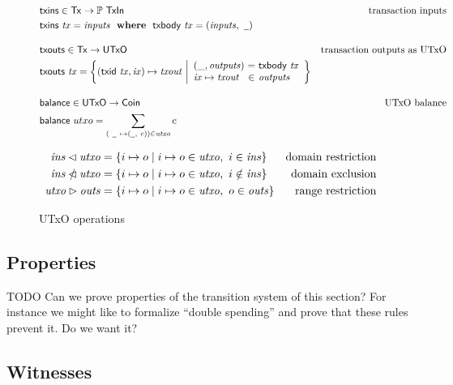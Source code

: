 \documentclass[11pt,a4paper]{article}
\newenvironment{todo}
  {\begin{bclogo}[logo=\bcoutil, couleur=red!5, couleurBarre=red, arrondi=0.2]{ TODO}}
    {\end{bclogo}}
\newcommand{\powerset}[1]{\mathbb{P}~#1}
\newcommand{\restrictdom}{\lhd}
\newcommand{\subtractdom}{\mathbin{\slashed{\restrictdom}}}
\newcommand{\restrictrange}{\rhd}
\newcommand{\var}[1]{\mathit{#1}}
\newcommand{\fun}[1]{\mathsf{#1}}
\newcommand{\type}[1]{\mathsf{#1}}
\newcommand{\nextdef}{\\[1em]}
\newcommand{\where}{~ ~ \mathbf{where}~ ~ }
\newcommand{\Tx}{\type{Tx}}
\newcommand{\UTxO}{\type{UTxO}}
\newcommand{\Coin}{\type{Coin}}
\newcommand{\TxIn}{\type{TxIn}}
\newcommand{\txins}[1]{\fun{txins}~ \var{#1}}
\newcommand{\txbody}[1]{\fun{txbody}~ \var{#1}}
\newcommand{\wcard}[0]{\underline{\phantom{a}}}
\begin{document}
\begin{figure}
  \begin{align*}
    & \fun{txins} \in \Tx \to \powerset{\TxIn}
    & \text{transaction inputs} \\
    & \txins{tx} = \var{inputs} \where \txbody{tx} = (\var{inputs}, ~\wcard)
    \nextdef
    & \fun{txouts} \in \Tx \to \UTxO
    & \text{transaction outputs as UTxO} \\
    & \fun{txouts} ~ \var{tx} =
      \left\{ (\fun{txid} ~ \var{tx}, \var{ix}) \mapsto \var{txout} ~
      \middle| \begin{array}{l@{~}c@{~}l}
                 (\_, \var{outputs}) & = & \txbody{tx} \\
                 \var{ix} \mapsto \var{txout} & \in & \var{outputs}
               \end{array}
      \right\}
    \nextdef
    & \fun{balance} \in \UTxO \to \Coin
    & \text{UTxO balance} \\
    & \fun{balance} ~ utxo = \sum_{(~\wcard ~ \mapsto (\wcard, ~c)) \in \var{utxo}} c
  \end{align*}

  \begin{align*}
    \var{ins} \restrictdom \var{utxo}
    & = \{ i \mapsto o \mid i \mapsto o \in \var{utxo}, ~ i \in \var{ins} \}
    & \text{domain restriction}
    \\
    \var{ins} \subtractdom \var{utxo}
    & = \{ i \mapsto o \mid i \mapsto o \in \var{utxo}, ~ i \notin \var{ins} \}
    & \text{domain exclusion}
    \\
    \var{utxo} \restrictrange \var{outs}
    & = \{ i \mapsto o \mid i \mapsto o \in \var{utxo}, ~ o \in \var{outs} \}
    & \text{range restriction}
  \end{align*}
  \caption{UTxO operations}
  \label{fig:utxo-auxiliary-ops}
\end{figure}

\subsection{Properties}
\label{sec:utxo-properties}

\begin{todo}
  Can we prove properties of the transition system of this section? For
  instance we might like to formalize ``double spending'' and prove that these
  rules prevent it. Do we want it?
\end{todo}

\subsection{Witnesses}
\label{sec:witnesses}
\end{document}
